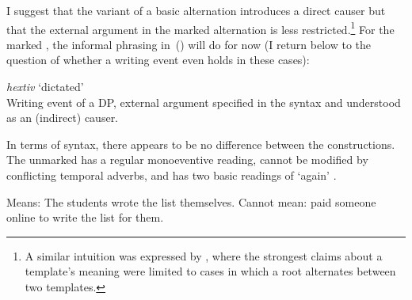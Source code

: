 \begin{exe}
\begin{xlist}
\begin{xlist}
\begin{exe}
\begin{exe}
\begin{xlist}
\begin{exe}
\begin{xlist}
\begin{exe}
\begin{xlist}
\begin{xlist}
\begin{exe}
\begin{xlist}
\begin{exe}
\begin{xlist}
\begin{exe}
\begin{exe}
\begin{exe}
\begin{xlist}
\begin{exe}
\begin{exe}
\begin{xlist}
\begin{xlist}
\begin{exe}
\begin{xlist}
\begin{exe}
\begin{exe}
\begin{exe}
\begin{xlist}
\begin{exe}
\begin{exe}
\begin{xlist}
\begin{exe}
\begin{xlist}
\begin{exe}
\begin{xlist}
\begin{exe}
\begin{xlist}
\begin{exe}
\begin{exe}
\begin{xlist}
I suggest that the  variant of a basic alternation introduces a direct causer \citep{bittner99,kratzer05} but that the external argument in the marked alternation is less restricted.\footnote{A similar intuition was expressed by \cite{doron03}, where the strongest claims about a template's meaning were limited to cases in which a root alternates between two templates.} For the marked , the informal phrasing in~(\nextx) will do for now (I return below to the question of whether a writing event even holds in these cases):
 \begin{exe}
\ex  \emph{hextiv} `dictated' \\
	Writing event of a DP, external argument specified in the syntax and understood as an (indirect) causer.
 \z 

In terms of syntax, there appears to be no difference between the constructions. The unmarked  has a regular monoeventive reading, cannot be modified by conflicting temporal adverbs, and has two basic readings of `again' \citep{vonstechow96}.

 \begin{exe}

		\begin{xlist}
	 	\ex  Means: The students wrote the list themselves. 
 		\ex  Cannot mean: paid someone online to write the list for them. 
 		\z

		

\end{xlist}
\end{exe}
\end{exe}
\end{xlist}
\end{exe}
\end{exe}
\end{xlist}
\end{exe}
\end{xlist}
\end{exe}
\end{xlist}
\end{exe}
\end{xlist}
\end{exe}
\end{exe}
\end{xlist}
\end{exe}
\end{exe}
\end{exe}
\end{xlist}
\end{exe}
\end{xlist}
\end{xlist}
\end{exe}
\end{exe}
\end{xlist}
\end{exe}
\end{exe}
\end{exe}
\end{xlist}
\end{exe}
\end{xlist}
\end{exe}
\end{xlist}
\end{xlist}
\end{exe}
\end{xlist}
\end{exe}
\end{xlist}
\end{exe}
\end{exe}
\end{xlist}
\end{xlist}
\end{exe}
